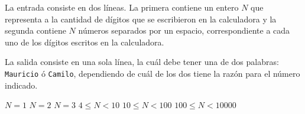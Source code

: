 \documentclass{oci}
\begin{document}
\begin{inputDescription}
La entrada consiste en dos líneas. La primera contiene un entero $N$ que representa a la cantidad de dígitos que se escribieron en la calculadora y la segunda contiene $N$ números separados por un espacio, correspondiente a cada uno de los dígitos escritos en la calculadora.
\end{inputDescription}

\begin{outputDescription}
La salida consiste en una sola línea, la cuál debe tener una de dos palabras: \texttt{Mauricio} ó \texttt{Camilo}, dependiendo
de cuál de los dos tiene la razón para el número indicado.
\end{outputDescription}

\begin{scoreDescription}
   $ N = 1$
   $ N = 2$
   $ N = 3$
   $ 4 \leq N < 10$
   $ 10 \leq N < 100$
   $ 100 \leq N < 10000$
\end{scoreDescription}

\begin{sampleDescription}
\end{sampleDescription}
\end{document}
